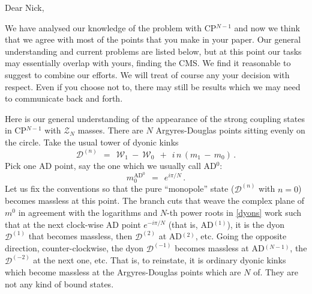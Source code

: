 \documentclass[epsfig,12pt]{article}
\def\beq{\begin{equation}}
\def\eeq{\end{equation}}
\def\beq{\begin{equation}}
\def\eeq{\end{equation}}
\newcommand{\mc}[1]{\mathcal{#1}}
\begin{document}
	\hspace{0.8cm}Dear Nick,


\vspace{0.8cm}

	We have analysed our knowledge of the problem with CP$^{N-1}$ and 
	now we think that we agree with most of the points that you make in your paper.
	Our general understanding and current problems are listed below, 
	but at this point our tasks may essentially overlap with yours, finding the CMS.
	We find it reasonable to suggest to combine our efforts. 
	We will treat of course any your decision with respect. 
	Even if you choose not to, there may still be results which we may need
	to communicate back and forth.
	

\vspace{0.8cm}

	Here is our general understanding of the appearance of the strong coupling states in
	CP$^{N-1}$ with $ \mc{Z}_N $ masses.
	There are $ N $ Argyres-Douglas points sitting evenly on the circle.
	Take the usual tower of dyonic kinks
\beq
\label{dyons}
	\mc{D}^{(n)} ~~=~~ \mc{W}_1 ~-~ \mc{W}_0  ~~+~~  i\,n\, (m_1 \,-\, m_0)\,.
\eeq
	Pick one AD point, say the one which we usually call AD$^0$:
\beq
	m_0^{\text{AD}^0} ~~=~~ e^{i\pi/N}\,.
\eeq
	Let us fix the conventions so that the pure ``monopole'' state ($ \mc{D}^{(n)} $ with $ n = 0 $)
	becomes massless at this point.
	The branch cuts that weave the complex plane of $ m^0 $ in agreement with the logarithms 
	and $N$-th power roots in \eqref{dyons} work such that at the next clock-wise AD point $ e^{- i \pi / N } $ (that is, AD$^{(1)}$),
	it is the dyon $ \mc{D}^{(1)} $ that becomes massless, then $ \mc{D}^{(2)} $ at AD$^{(2)}$, etc.
	Going the opposite direction, counter-clockwise, the dyon $ \mc{D}^{(-1)} $ becomes massless
	at AD$^{(N-1)}$, the $ \mc{D}^{(-2)} $ at the next one, etc.
	That is, to reinstate, it is ordinary dyonic kinks which become massless at the Argyres-Douglas points
	which are $ N $ of.
	They are not any kind of bound states.
	
\end{document}
